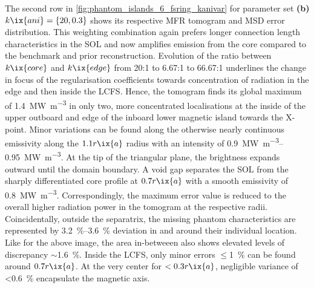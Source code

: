                 The second row in \cref{fig:phantom_islands_6_fsring_kanivar} for parameter set \textbf{(b)} $k\ix{ani}=\left\{20, 0.3\right\}$ shows its respective MFR tomogram and MSD error distribution. This weighting combination again prefers longer connection length characteristics in the SOL and now amplifies emission from the core compared to the benchmark and prior reconstruction. Evolution of the ratio between $k\ix{core}$ and $k\ix{edge}$ from 20:1 to 6.67:1 to 66.67:1 underlines the change in focus of the regularisation coefficients towards concentration of radiation in the edge and then inside the LCFS. Hence, the tomogram finds its global maximum of \SI{1.4}{\mega\watt\per\cubic\meter} in only two, more concentrated localisations at the inside of the upper outboard and edge of the inboard lower magnetic island towards the X-point. Minor variations can be found along the otherwise nearly continuous emissivity along the $1.1r\ix{a}$ radius with an intensity of \SIrange{0.9}{0.95}{\mega\watt\per\cubic\meter}. At the tip of the triangular plane, the brightness expands outward until the domain boundary. A void gap separates the SOL from the sharply differentiated core profile at $0.7r\ix{a}$ with a smooth emissivity of \SI{0.8}{\mega\watt\per\cubic\meter}. Correspondingly, the maximum error value is reduced to the overall higher radiation power in the tomogram at the respective radii. Coincidentally, outside the separatrix, the missing phantom characteristics are represented by \SIrange{3.2}{3.6}{\percent} deviation in and around their individual location. Like for the above image, the area in-betweeen also shows elevated levels of discrepancy $\sim$\SI{1.6}{\percent}. Inside the LCFS, only minor errors $\le$\SI{1}{\percent} can be found around $0.7r\ix{a}$. At the very center for $<0.3r\ix{a}$, negligible variance of <\SI{0.6}{\percent} encapsulate the magnetic axis.\\%
